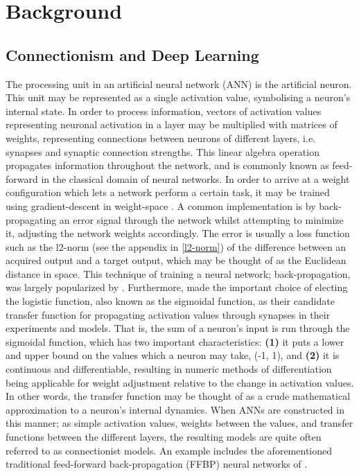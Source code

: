 
\chapter{Background}\label{chpt:background}

\section{Connectionism and Deep Learning}
The processing unit in an artificial neural network (ANN) is the artificial neuron. This unit may be represented as a single activation value, symbolising a neuron's internal state. In order to process information, vectors of activation values representing neuronal activation in a layer may be multiplied with matrices of weights, representing connections between neurons of different layers, i.e. synapses and synaptic connection strengths. This linear algebra operation propagates information throughout the network, and is commonly known as feed-forward in the classical domain of neural networks. In order to arrive at a weight configuration which lets a network perform a certain task, it may be trained using gradient-descent in weight-space \citep{Hinton1989}. A common implementation is by  back-propagating an error signal through the network whilst attempting to minimize it, adjusting the network weights accordingly. The error is usually a loss function such as the l2-norm (see the appendix in \ref{l2-norm}) of the difference between an acquired output and a target output, which may be thought of as the Euclidean distance in space. This technique of training a neural network; back-propagation, was largely popularized by \cite{Rumelhart1986}. Furthermore, \cite{Rumelhart1986} made the important choice of electing the logistic function, also known as the sigmoidal function, as their candidate transfer function for propagating activation values through synapses in their experiments and models. That is, the sum of a neuron's input is run through the sigmoidal function, which has two important characteristics: \textbf{(1)} it puts a lower and upper bound on the values which a neuron may take, (-1, 1), and \textbf{(2)} it is continuous and differentiable, resulting in numeric methods of differentiation being applicable for weight adjustment relative to the change in activation values. In other words, the transfer function may be thought of as a crude mathematical approximation to a neuron's internal dynamics.
When ANNs are constructed in this manner; as simple activation values, weights between the values, and transfer functions between the different layers, the resulting models are quite often referred to as connectionist models. An example includes the aforementioned traditional feed-forward back-propagation (FFBP) neural networks of \citep{Rumelhart1986}.

